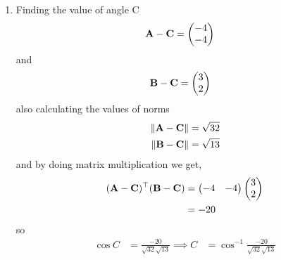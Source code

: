 \documentclass[11pt]{book}
\begin{document}
\begin{enumerate}[label=\thesection.\arabic*.,ref=\thesection.\theenumi]
\begin{enumerate}
\item Finding the value of angle C
\begin{align}
	\mathbf{A}-\mathbf{C} &=\begin{pmatrix}-4\\-4\end{pmatrix}
\end{align}
and 
\begin{align}
	\mathbf{B}-\mathbf{C}&= \begin{pmatrix}3\\2\end{pmatrix}
\end{align}
also calculating the values of norms
\begin{align}
	\left\lVert\mathbf{A}-\mathbf{C}\right\rVert &= \sqrt{32}\\
	\left\lVert\mathbf{B}-\mathbf{C}\right\rVert &= \sqrt{13}
\end{align}
and by doing matrix multiplication we get,
\begin{align}
\begin{split}
	(\mathbf{A}-\mathbf{C})^{\top}(\mathbf{B}-\mathbf{C})&=\begin{pmatrix}-4&-4\end{pmatrix}\begin{pmatrix}3\\2\end{pmatrix}\\
	&=-20
\end{split}
\end{align}
so 
\begin{align}
	\cos{C}&= \frac{-20}{\sqrt{32} \sqrt{13}}
	\implies C&=\cos^{-1}{ \frac{-20}{\sqrt{32} \sqrt{13}}}
\end{align}
\end{enumerate}
\end{enumerate}
%
\end{document}
